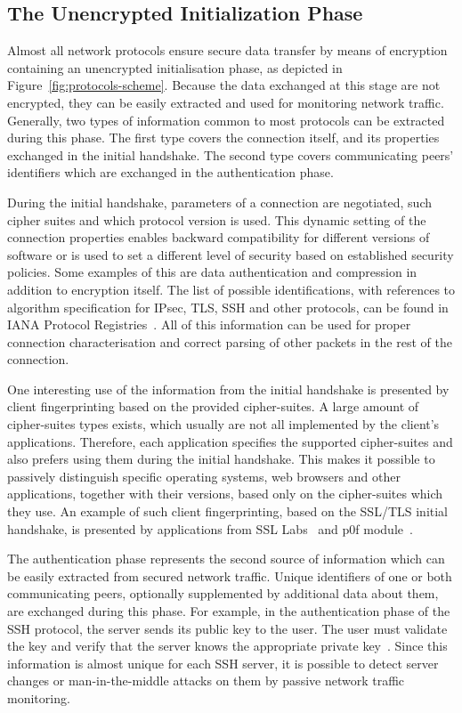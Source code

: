 \subsection{The Unencrypted Initialization Phase}

Almost all network protocols ensure secure data transfer by means of encryption containing an unencrypted initialisation phase, as depicted in Figure~\ref{fig:protocols-scheme}. Because the data exchanged at this stage are not encrypted, they can be easily extracted and used for monitoring network traffic. Generally, two types of information common to most protocols can be extracted during this phase. The first type covers the connection itself, and its properties exchanged in the initial handshake. The second type covers communicating peers' identifiers which are exchanged in the authentication phase.

During the initial handshake, parameters of a connection are negotiated, such cipher suites and which protocol version is used. This dynamic setting of the connection properties enables backward compatibility for different versions of software or is used to set a different level of security based on established security policies. Some examples of this are data authentication and compression in addition to encryption itself. The list of possible identifications, with references to algorithm specification for IPsec, TLS, SSH and other protocols, can be found in IANA Protocol Registries~\cite{iana-protocol-registries}. All of this information can be used for proper connection characterisation and correct parsing of other packets in the rest of the connection.

One interesting use of the information from the initial handshake is presented by client fingerprinting based on the provided cipher-suites. A large amount of cipher-suites types exists, which usually are not all implemented by the client's applications. Therefore, each application specifies the supported cipher-suites and also prefers using them during the initial handshake. This makes it possible to passively distinguish specific operating systems, web browsers and other applications, together with their versions, based only on the cipher-suites which they use. An example of such client fingerprinting, based on the SSL/TLS initial handshake, is presented by applications from SSL Labs~\cite{qualys-ssl-fingerprinting} and p0f module~\cite{p0f-ssl-fingerprint}.

The authentication phase represents the second source of information which can be easily extracted from secured network traffic. Unique identifiers of one or both communicating peers, optionally supplemented by additional data about them, are exchanged during this phase. For example, in the authentication phase of the SSH protocol, the server sends its public key to the user. The user must validate the key and verify that the server knows the appropriate private key~\cite{rfc4253}. Since this information is almost unique for each SSH server, it is possible to detect server changes or man-in-the-middle attacks on them by passive network traffic monitoring. 

